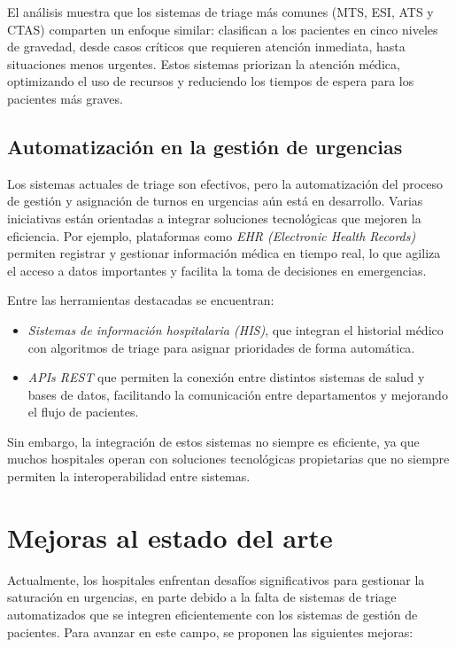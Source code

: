 El análisis muestra que los sistemas de triage más comunes (MTS, ESI, ATS y CTAS) comparten un enfoque similar: clasifican a los pacientes en cinco niveles de gravedad, desde casos críticos que requieren atención inmediata, hasta situaciones menos urgentes.
Estos sistemas priorizan la atención médica, optimizando el uso de recursos y reduciendo los tiempos de espera para los pacientes más graves.

\subsection{Automatización en la gestión de urgencias}

Los sistemas actuales de triage son efectivos, pero la automatización del proceso de gestión y asignación de turnos en urgencias aún está en desarrollo.
Varias iniciativas están orientadas a integrar soluciones tecnológicas que mejoren la eficiencia.
Por ejemplo, plataformas como \textit{EHR (Electronic Health Records)} permiten registrar y gestionar información médica en tiempo real, lo que agiliza el acceso a datos importantes y facilita la toma de decisiones en emergencias.

Entre las herramientas destacadas se encuentran:

\begin{itemize}
    \item \textit{Sistemas de información hospitalaria (HIS)}, que integran el historial médico con algoritmos de triage para asignar prioridades de forma automática.
    \item \textit{APIs REST} que permiten la conexión entre distintos sistemas de salud y bases de datos, facilitando la comunicación entre departamentos y mejorando el flujo de pacientes.
\end{itemize}

Sin embargo, la integración de estos sistemas no siempre es eficiente, ya que muchos hospitales operan con soluciones tecnológicas propietarias que no siempre permiten la interoperabilidad entre sistemas.

\section{Mejoras al estado del arte}

Actualmente, los hospitales enfrentan desafíos significativos para gestionar la saturación en urgencias, en parte debido a la falta de sistemas de triage automatizados que se integren eficientemente con los sistemas de gestión de pacientes. Para avanzar en este campo, se proponen las siguientes mejoras:

